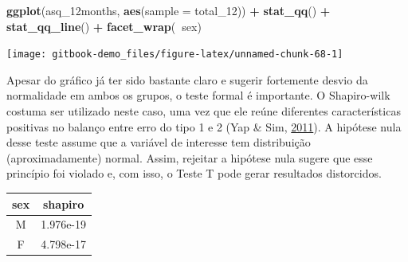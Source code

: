 \documentclass[
]{book}
\newenvironment{Shaded}{\begin{snugshade}}{\end{snugshade}}
\newcommand{\DataTypeTok}[1]{\textcolor[rgb]{0.13,0.29,0.53}{#1}}
\newcommand{\DecValTok}[1]{\textcolor[rgb]{0.00,0.00,0.81}{#1}}
\newcommand{\KeywordTok}[1]{\textcolor[rgb]{0.13,0.29,0.53}{\textbf{#1}}}
\newcommand{\NormalTok}[1]{#1}
\newcommand{\OperatorTok}[1]{\textcolor[rgb]{0.81,0.36,0.00}{\textbf{#1}}}
\newcommand{\StringTok}[1]{\textcolor[rgb]{0.31,0.60,0.02}{#1}}
\begin{document}
\begin{Shaded}
\begin{Highlighting}[]
\KeywordTok{ggplot}\NormalTok{(asq_12months, }\KeywordTok{aes}\NormalTok{(}\DataTypeTok{sample =}\NormalTok{ total_}\DecValTok{12}\NormalTok{)) }\OperatorTok{+}\StringTok{ }
\StringTok{  }\KeywordTok{stat_qq}\NormalTok{() }\OperatorTok{+}\StringTok{ }
\StringTok{  }\KeywordTok{stat_qq_line}\NormalTok{() }\OperatorTok{+}
\StringTok{  }\KeywordTok{facet_wrap}\NormalTok{(}\OperatorTok{~}\NormalTok{sex)}
\end{Highlighting}
\end{Shaded}

\begin{center}\texttt{[image: gitbook-demo\_files/figure-latex/unnamed-chunk-68-1]} \end{center}

Apesar do gráfico já ter sido bastante claro e sugerir fortemente desvio
da normalidade em ambos os grupos, o teste formal é importante. O
Shapiro-wilk costuma ser utilizado neste caso, uma vez que ele reúne
diferentes características positivas no balanço entre erro do tipo 1 e 2
(Yap \& Sim, \protect\hyperlink{ref-Yap2011}{2011}). A hipótese nula
desse teste assume que a variável de interesse tem distribuição
(aproximadamente) normal. Assim, rejeitar a hipótese nula sugere que
esse princípio foi violado e, com isso, o Teste T pode gerar resultados
distorcidos.

\begin{Shaded}
\end{Shaded}

\begin{longtable}[]{@{}cc@{}}
\toprule
\begin{minipage}[b]{0.08\columnwidth}\centering
sex\strut
\end{minipage} & \begin{minipage}[b]{0.16\columnwidth}\centering
shapiro\strut
\end{minipage}\tabularnewline
\midrule
\endhead
\begin{minipage}[t]{0.08\columnwidth}\centering
M\strut
\end{minipage} & \begin{minipage}[t]{0.16\columnwidth}\centering
1.976e-19\strut
\end{minipage}\tabularnewline
\begin{minipage}[t]{0.08\columnwidth}\centering
F\strut
\end{minipage} & \begin{minipage}[t]{0.16\columnwidth}\centering
4.798e-17\strut
\end{minipage}\tabularnewline
\bottomrule
\end{longtable}
\end{document}

